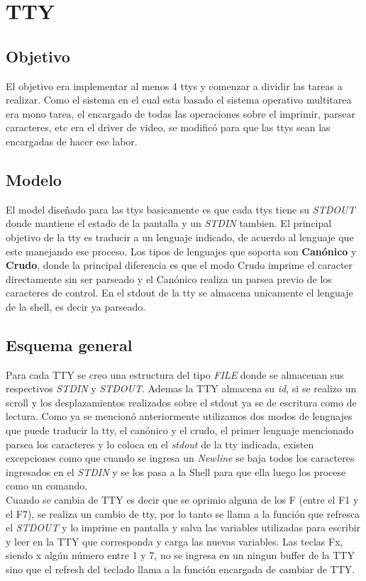 \documentclass[10pt,a4paper]{article}
\begin{document}
\section{TTY}
	\subsection{Objetivo}
		El objetivo era implementar al menos 4 ttys y comenzar a dividir las tareas a realizar. Como el sistema en el cual esta basado el sistema operativo multitarea era mono tarea, el encargado de todas las operaciones sobre el imprimir, parsear caracteres, etc era el driver de video, se modific\'o para que las ttys sean las encargadas de hacer ese labor.
	\subsection{Modelo}
		El model diseñado para las ttys basicamente es que cada ttys tiene su \textit{STDOUT} donde mantiene el estado de la pantalla y un \textit{STDIN} tambien. El principal objetivo de la tty es traducir a un lenguaje indicado, de acuerdo al lenguaje que este manejando ese proceso. Los tipos de lenguajes que soporta son \textbf{Can\'onico} y \textbf{Crudo}, donde la principal diferencia es que el modo Crudo imprime el caracter directamente sin ser parseado y el Can\'onico realiza un parsea previo de los caracteres de control. En el stdout de la tty se almacena unicamente el lenguaje de la shell, es decir ya parseado.
	\subsection{Esquema general}
		Para cada TTY se creo una estructura del tipo \textit{FILE} donde se almacenan sus respectivos \textit{STDIN} y \textit{STDOUT}. Ademas la TTY almacena su \textit{id}, si se realizo un scroll y los desplazamientos realizados sobre el stdout ya se de escritura como de lectura. Como ya se mencion\'o anteriormente utilizamos dos modos de lenguajes que puede traducir la tty, el can\'onico y el crudo, el primer lenguaje mencionado parsea los caracteres y lo coloca en el \textit{stdout} de la tty indicada, existen excepciones como que cuando se ingresa un \textit{Newline} se baja todos los caracteres ingresados en el \textit{STDIN} y se los pasa a la Shell para que ella luego los procese como un comando. \\
		Cuando se cambia de TTY es decir que se oprimio alguna de los F (entre el F1 y el F7), se realiza un cambio de tty, por lo tanto se llama a la funci\'on que refresca el \textit{STDOUT} y lo imprime en pantalla y salva las variables utilizadas para escribir y leer en la TTY que corresponda y carga las nuevas variables. Las teclas Fx, siendo x alg\'un n\'umero entre 1 y 7, no se ingresa en un ningun buffer de la TTY sino que el refresh del teclado llama a la funci\'on encargada de cambiar de TTY.\\
\end{document}
